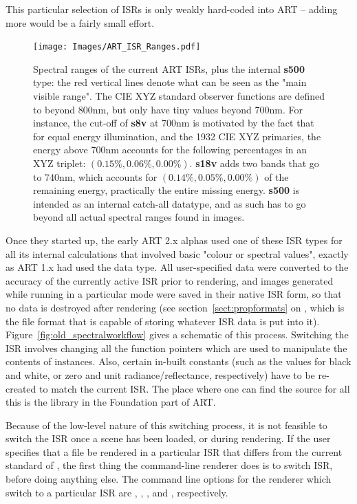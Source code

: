 This particular selection of ISRs is only weakly hard-coded into ART -- adding more would be a fairly small effort. 

\begin{figure}[htb]
\begin{center}
\texttt{[image: Images/ART\_ISR\_Ranges.pdf]} 
\end{center}
\caption{
\label{fig:art_isr_ranges} 
Spectral ranges of the current ART ISRs, plus the internal \textbf{s500} type: the red vertical lines denote what can be seen as the "main visible range". The CIE XYZ standard observer functions are defined to beyond 800nm, but only have tiny values beyond 700nm. For instance, the cut-off of \textbf{s8v} at 700nm is motivated by the fact that for equal energy illumination, and the 1932 CIE XYZ primaries, the energy above 700nm accounts for the following percentages in an XYZ triplet: $(0.15\%,0.06\%,0.00\%)$. \textbf{s18v} adds two bands that go to 740nm, which accounts for $(0.14\%,0.05\%,0.00\%)$ of the remaining energy, \ie practically the entire missing energy. \textbf{s500} is intended as an internal catch-all datatype, and as such has to go beyond all actual spectral ranges found in  images.
}
\end{figure}

Once they started up, the early ART 2.x alphas used one of these ISR types for all its internal calculations that involved basic "colour or spectral values", exactly as ART 1.x had used the  data type. All user-specified data were converted to the accuracy of the currently active ISR prior to rendering, and images generated while running in a particular mode were saved in their native ISR form, so that no data is destroyed after rendering (see section~\ref{sect:propformats} on , which is the file format that is capable of storing whatever ISR data is put into it). Figure~\ref{fig:old_spectralworkflow} gives a schematic of this process. Switching the ISR involves changing all the function pointers which are used to manipulate the contents of  instances. Also, certain in-built constants (such as the values for black and white, or zero and unit radiance/reflectance, respectively) have to be re-created to match the current ISR. The place where one can find the source for all this is the  library in the Foundation part of ART.

Because of the low-level nature of this switching process, it is not feasible to switch the ISR once a scene has been loaded, or during rendering. If the user specifies that a file be rendered in a particular ISR that differs from the current standard of , the first thing the  command-line renderer does is to switch ISR, before doing anything else. The command line options for the  renderer which switch to a particular ISR are , , ,  and , respectively.

